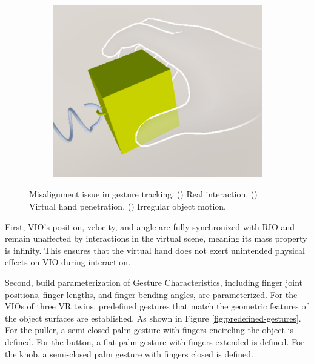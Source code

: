 \begin{figure}
\begin{subfigure}{0.31\linewidth}
    \caption{} %
    \label{fig:gesture-tracking-deviations-b}
  \end{subfigure}
  \hfill %
  \begin{subfigure}{0.31\linewidth} %
    \centering
    \includegraphics[width=\linewidth]{image/gesture-tracking-deviations-c.pdf}
    \caption{} %
    \label{fig:gesture-tracking-deviations-c}
  \end{subfigure}
  \caption{Misalignment issue in gesture tracking. () Real interaction, () Virtual hand penetration, () Irregular object motion.}
  \label{fig:gesture-tracking-deviations}
\end{figure}

First, VIO's position, velocity, and angle are fully synchronized with RIO and remain unaffected by interactions in the virtual scene, meaning its mass property is infinity. This ensures that the virtual hand does not exert unintended physical effects on VIO during interaction.

Second, build parameterization of Gesture Characteristics, including finger joint positions, finger lengths, and finger bending angles, are parameterized. For the VIOs of three VR twins, predefined gestures that match the geometric features of the object surfaces are established. As shown in Figure \ref{fig:predefined-gestures}. For the puller, a semi-closed palm gesture with fingers encircling the object is defined. For the button, a flat palm gesture with fingers extended is defined. For the knob, a semi-closed palm gesture with fingers closed is defined.

